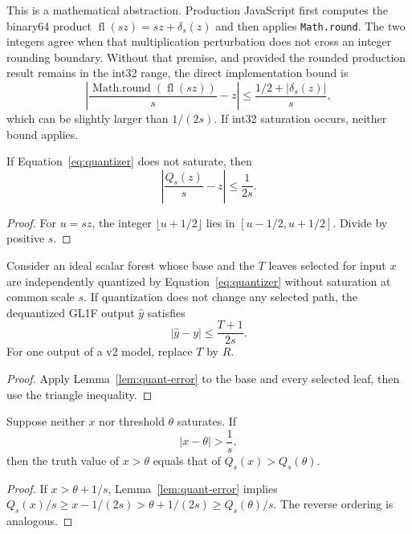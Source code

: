This is a mathematical abstraction.  Production JavaScript first computes the
binary64 product
$\operatorname{fl}(sz)=sz+\delta_s(z)$ and then applies
\texttt{Math.round}.  The two integers agree when that multiplication
perturbation does not cross an integer rounding boundary.  Without that
premise, and provided the rounded production result remains in the int32
range, the direct implementation bound is
\[
 \left|
 \frac{\operatorname{Math.round}(\operatorname{fl}(sz))}{s}-z
 \right|
 \le \frac{1/2+|\delta_s(z)|}{s},
\]
which can be slightly larger than $1/(2s)$.  If int32 saturation occurs,
neither bound applies.

\begin{lemma}
\label{lem:quant-error}
If Equation~\ref{eq:quantizer} does not saturate, then
\[
 \left|\frac{Q_s(z)}{s}-z\right|\le\frac{1}{2s}.
\]
\end{lemma}

\begin{proof}
For $u=sz$, the integer $\lfloor u+1/2\rfloor$ lies in
$[u-1/2,u+1/2]$.  Divide by positive $s$.
\end{proof}

\begin{theorem}
\label{thm:stable-path-error}
Consider an ideal scalar forest whose base and the $T$ leaves selected for
input $x$ are independently quantized by Equation~\ref{eq:quantizer} without
saturation at common scale $s$.  If quantization does not change any selected
path, the dequantized GL1F output
$\widehat y$ satisfies
\[
 |\widehat y-y|\le\frac{T+1}{2s}.
\]
For one output of a v2 model, replace $T$ by $R$.
\end{theorem}

\begin{proof}
Apply Lemma~\ref{lem:quant-error} to the base and every selected leaf, then use
the triangle inequality.
\end{proof}

\begin{lemma}
\label{lem:split-margin}
Suppose neither $x$ nor threshold $\theta$ saturates.  If
\[
 |x-\theta|>\frac1s,
\]
then the truth value of $x>\theta$ equals that of
$Q_s(x)>Q_s(\theta)$.
\end{lemma}

\begin{proof}
If $x>\theta+1/s$, Lemma~\ref{lem:quant-error} implies
$Q_s(x)/s\ge x-1/(2s)>\theta+1/(2s)\ge Q_s(\theta)/s$.
The reverse ordering is analogous.
\end{proof}

